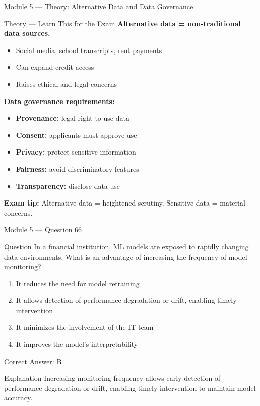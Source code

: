 \documentclass[aspectratio=169,10pt]{beamer}
\newcommand{\question}[1]{%
	\begin{block}{Question}
		#1
	\end{block}
}
\newcommand{\options}[4]{%
	\begin{enumerate}[label=\Alph*.,leftmargin=*]
		\item #1
		\item #2
		\item #3
		\item #4
	\end{enumerate}
}
\newcommand{\answerbox}[1]{%
	\begin{exampleblock}{Correct Answer: #1}
	\end{exampleblock}
}
\newcommand{\explain}[1]{%
	\begin{block}{Explanation}
		\small #1
	\end{block}
}
\newcommand{\theory}[1]{%
	\begin{block}{Theory --- Learn This for the Exam}
		\small #1
	\end{block}
}
\begin{document}
	\begin{frame}{Module 5 --- Theory: Alternative Data and Data Governance}
		\theory{
			\textbf{Alternative data = non-traditional data sources.}
			\begin{itemize}
				\item Social media, school transcripts, rent payments
				\item Can expand credit access
				\item Raises ethical and legal concerns
			\end{itemize}
			\textbf{Data governance requirements:}
			\begin{itemize}
				\item \textbf{Provenance:} legal right to use data
				\item \textbf{Consent:} applicants must approve use
				\item \textbf{Privacy:} protect sensitive information
				\item \textbf{Fairness:} avoid discriminatory features
				\item \textbf{Transparency:} disclose data use
			\end{itemize}
			\textbf{Exam tip:} Alternative data = heightened scrutiny. Sensitive data = material concerns.
		}
	\end{frame}
	
	\begin{frame}{Module 5 --- Question 66}
		\question{In a financial institution, ML models are exposed to rapidly changing data environments. What is an advantage of increasing the frequency of model monitoring?}
		\options{It reduces the need for model retraining}{It allows detection of performance degradation or drift, enabling timely intervention}{It minimizes the involvement of the IT team}{It improves the model's interpretability}
		\answerbox{B}
		\explain{Increasing monitoring frequency allows early detection of performance degradation or drift, enabling timely intervention to maintain model accuracy.}
	\end{frame}
	
\end{document}
